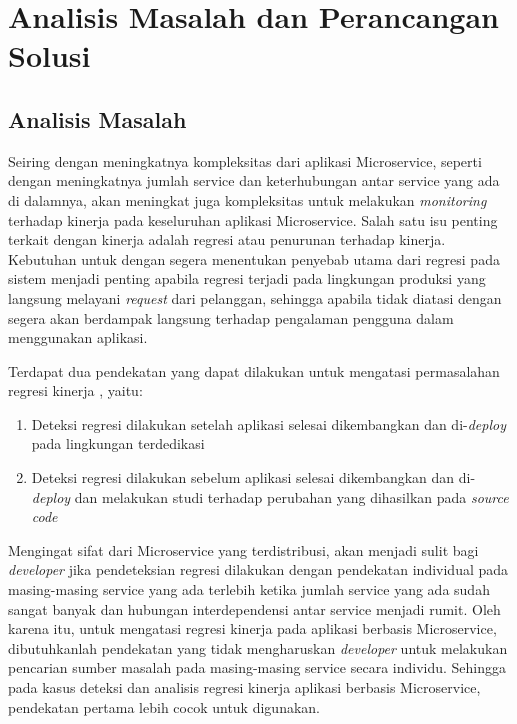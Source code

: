 \chapter{Analisis Masalah dan Perancangan Solusi}


\section{Analisis Masalah}

Seiring dengan meningkatnya kompleksitas dari aplikasi Microservice, seperti dengan meningkatnya jumlah service dan keterhubungan antar service yang ada di dalamnya, akan meningkat juga kompleksitas untuk melakukan \textit{monitoring} terhadap kinerja pada keseluruhan aplikasi Microservice. Salah satu isu penting terkait dengan kinerja adalah regresi atau penurunan terhadap kinerja. Kebutuhan untuk dengan segera menentukan penyebab utama dari regresi pada sistem menjadi penting apabila regresi terjadi pada lingkungan produksi yang langsung melayani \textit{request} dari pelanggan, sehingga apabila tidak diatasi dengan segera akan berdampak langsung terhadap pengalaman pengguna dalam menggunakan aplikasi. 

Terdapat dua pendekatan yang dapat dilakukan untuk mengatasi permasalahan regresi kinerja \citep{regression-detection}, yaitu:
\begin{enumerate}
	\item Deteksi regresi dilakukan setelah aplikasi selesai dikembangkan dan di-\textit{deploy} pada lingkungan terdedikasi
	\item Deteksi regresi dilakukan sebelum aplikasi selesai dikembangkan dan di-\textit{deploy} dan melakukan studi terhadap perubahan yang dihasilkan pada \textit{source code}
\end{enumerate}  

Mengingat sifat dari Microservice yang terdistribusi, akan menjadi sulit bagi \textit{developer} jika pendeteksian regresi dilakukan dengan pendekatan individual pada masing-masing service yang ada terlebih ketika jumlah service yang ada sudah sangat banyak dan hubungan interdependensi antar service menjadi rumit. Oleh karena itu, untuk mengatasi regresi kinerja pada aplikasi berbasis Microservice, dibutuhkanlah pendekatan yang tidak mengharuskan \textit{developer} untuk melakukan pencarian sumber masalah pada masing-masing service secara individu. Sehingga pada kasus deteksi dan analisis regresi kinerja aplikasi berbasis Microservice, pendekatan pertama lebih cocok untuk digunakan.

